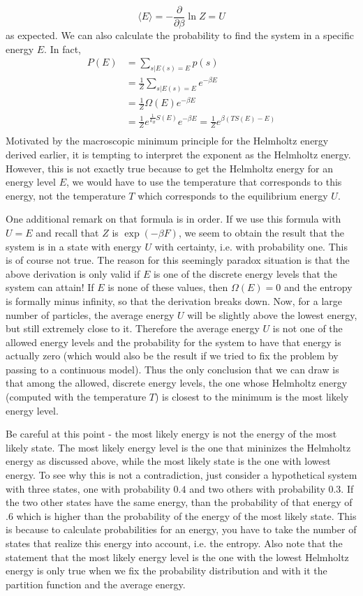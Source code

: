 \documentclass[a4paper, draft]{article}
\theoremstyle{own}
\theoremstyle{remark}
\begin{document}
$$
\langle E \rangle = - \frac{\partial }{\partial \beta} \ln Z  = U
$$
as expected. We can also calculate the probability to find the system in a specific energy $E$. In fact,
\begin{align*}
P(E) &= \sum_{s | E(s) = E} p(s) \\
&=   \frac{1}{Z} \sum_{s | E(s) = E} e^{-\beta E} \\
&= \frac{1}{Z}  \Omega(E) e^{-\beta E} \\
&= \frac{1}{Z}  e^{\frac{1}{k_B} S(E)} e^{-\beta E} = \frac{1}{Z}  e^{\beta(TS(E) - E)} \\
\end{align*}
Motivated by the macroscopic minimum principle for the Helmholtz energy derived earlier, it is tempting to interpret the exponent as the Helmholtz energy. However, this is not exactly true because to get the Helmholtz energy for an energy level $E$, we would have to use the temperature that corresponds to this energy, not the temperature $T$ which corresponds to the equilibrium energy $U$. 

One additional remark on that formula is in order. If we use this formula with $U=E$ and recall that $Z$ is $\exp(-\beta F)$, we seem to obtain the result that the system is in a state with energy $U$ with certainty, i.e. with probability one. This is of course not true. The reason for this seemingly paradox situation is that the above derivation is only valid if $E$ is one of the discrete energy levels that the system can attain! If $E$ is none of these values, then $\Omega(E) = 0$ and the entropy is formally minus infinity, so that the derivation breaks down. Now, for a large number of particles, the average energy $U$ will be slightly above the lowest energy, but still extremely close to it. Therefore the average energy $U$ is not one of the allowed energy levels and the probability for the system to have that energy is actually zero (which would also be the result if we tried to fix the problem by passing to a continuous model). Thus the only conclusion that we can draw is that among the allowed, discrete energy levels, the one whose Helmholtz energy (computed with the temperature $T$) is closest to the minimum is the most likely energy level.

Be careful at this point - the most likely energy is not the energy of the most likely state. The most likely energy level is the one that mininizes the Helmholtz energy as discussed above, while the most likely state is the one with lowest energy. To see why this is not a contradiction, just consider a hypothetical system with three states, one with probability $0.4$ and two others with probability $0.3$. If the two other states have the same energy, than the probability of that energy of $.6$ which is higher than the probability of the energy of the most likely state. This is because to calculate probabilities for an energy, you have to take the number of states that realize this energy into account, i.e. the entropy. Also note that the statement that the most likely energy level is the one with the lowest Helmholtz energy is only true when we fix the probability distribution and with it the partition function and the average energy. 
\end{document}

